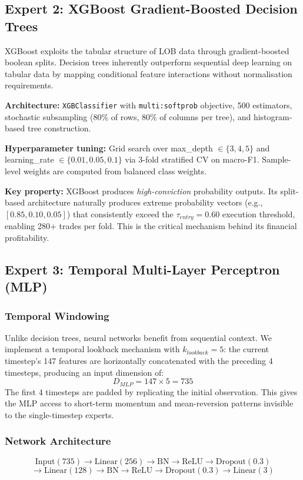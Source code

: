 \documentclass[conference]{IEEEtran}
\begin{document}
\subsection{Expert 2: XGBoost Gradient-Boosted Decision Trees}
XGBoost exploits the tabular structure of LOB data through gradient-boosted
boolean splits. Decision trees inherently outperform sequential deep
learning on tabular data by mapping conditional feature interactions
without normalisation requirements.

\textbf{Architecture:} \texttt{XGBClassifier} with \texttt{multi:softprob}
objective, 500 estimators, stochastic subsampling (80\% of rows, 80\%
of columns per tree), and histogram-based tree construction.

\textbf{Hyperparameter tuning:} Grid search over max\_depth $\in \{3, 4, 5\}$
and learning\_rate $\in \{0.01, 0.05, 0.1\}$ via 3-fold stratified CV on
macro-F1. Sample-level weights are computed from balanced class weights.

\textbf{Key property:} XGBoost produces \textit{high-conviction}
probability outputs. Its split-based architecture naturally produces
extreme probability vectors (e.g., $[0.85, 0.10, 0.05]$) that consistently
exceed the $\tau_{entry}=0.60$ execution threshold, enabling 280+ trades
per fold. This is the critical mechanism behind its financial profitability.

\subsection{Expert 3: Temporal Multi-Layer Perceptron (MLP)}

\subsubsection{Temporal Windowing}
Unlike decision trees, neural networks benefit from sequential context.
We implement a temporal lookback mechanism with $k_{lookback}=5$: the
current timestep's 147 features are horizontally concatenated with the
preceding 4 timesteps, producing an input dimension of:
\begin{equation}
    D_{MLP} = 147 \times 5 = 735
\end{equation}
The first 4 timesteps are padded by replicating the initial observation.
This gives the MLP access to short-term momentum and mean-reversion
patterns invisible to the single-timestep experts.

\subsubsection{Network Architecture}
\begin{equation*}
\text{Input}(735) \rightarrow \text{Linear}(256) \rightarrow \text{BN} \rightarrow \text{ReLU} \rightarrow \text{Dropout}(0.3)
\end{equation*}
\begin{equation*}
\rightarrow \text{Linear}(128) \rightarrow \text{BN} \rightarrow \text{ReLU} \rightarrow \text{Dropout}(0.3) \rightarrow \text{Linear}(3)
\end{equation*}
\end{document}
